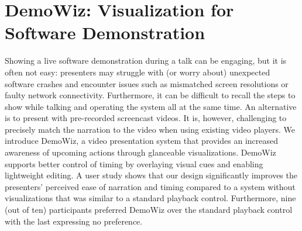 \chapter{DemoWiz: Visualization for Software Demonstration}
\label{chapter_demowiz}

Showing a live software demonstration during a talk can be engaging, but it is often not easy: presenters may struggle with (or worry about) unexpected software crashes and encounter issues such as mismatched screen resolutions or faulty network connectivity. Furthermore, it can be difficult to recall the steps to show while talking and operating the system all at the same time. An alternative is to present with pre-recorded screencast videos. It is, however, challenging to precisely match the narration to the video when using existing video players. We introduce DemoWiz, a video presentation system that provides an increased awareness of upcoming actions through glanceable visualizations. DemoWiz supports better control of timing by overlaying visual cues and enabling lightweight editing. A user study shows that our design significantly improves the presenters’ perceived ease of narration and timing compared to a system without visualizations that was similar to a standard playback control. Furthermore, nine (out of ten) participants preferred DemoWiz over the standard playback control with the last expressing no preference.








